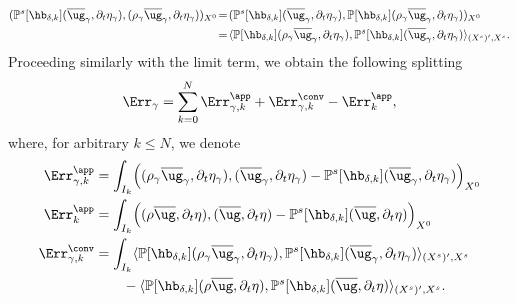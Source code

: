 \begin{align*}
( \mathbb{P}^{s}[\hb_{\delta, k}](\overline{\ug}_{\gamma},\partial_{t}\eta_{\gamma}),(\rho_{\gamma} \overline{\ug}_{\gamma},\partial_t \eta_{\gamma}))_{X^0}
& \!=\! ( \mathbb{P}^{s}[\hb_{\delta, k}](\overline{\ug}_{\gamma},\partial_{t}\eta_{\gamma}),\mathbb P[\hb_{\delta,k}](\rho_{\gamma} \overline{\ug}_{\gamma},\partial_t \eta_{\gamma}))_{X^0} \\
& \!=\! \langle \mathbb P[\hb_{\delta,k}](\rho_{\gamma} \overline{\ug}_{\gamma},\partial_t \eta_{\gamma}), \mathbb{P}^{s}[\hb_{\delta, k}](\overline{\ug}_{\gamma},\partial_{t}\eta_{\gamma}) \rangle_{(X^s)',X^s}.
\end{align*}
Proceeding similarly with the limit term, we obtain the following splitting
\[
\Err_{\gamma} = \sum_{k=0}^N \Err^{\app}_{\gamma,k} + \Err^{\conv}_{\gamma,k} - \Err^{\app}_{k},
\]
where, for arbitrary $k \leq N$, we denote
\begin{align*}
\Err^{\app}_{\gamma,k} & = \int_{I_{k}} \Bigl( (\rho_{\gamma} \overline{\ug}_{\gamma},\partial_t \eta_{\gamma}),( \overline{\ug}_{\gamma},\partial_t \eta_{\gamma})- \mathbb{P}^{s}[\hb_{\delta, k}](\overline{\ug}_{\gamma},\partial_{t}\eta_{\gamma})\Bigr)_{X^0} \\
\Err^{\app}_{k} &= \int_{I_{k}} \Bigl( (\rho \overline{\ug},\partial_t \eta),( \overline{\ug},\partial_t \eta)- \mathbb{P}^{s}[\hb_{\delta, k}](\overline{\ug},\partial_{t}\eta)\Bigr)_{X^0}\\
\Err^{\conv}_{\gamma,k} &= \int_{I_k} \langle \mathbb P[\hb_{\delta,k}](\rho_{\gamma} \overline{\ug}_{\gamma},\partial_t \eta_{\gamma}), \mathbb{P}^{s}[\hb_{\delta, k}](\overline{\ug}_{\gamma},\partial_{t}\eta_{\gamma}) \rangle_{(X^s)',X^s} \\
& \qquad
- \langle \mathbb P[\hb_{\delta,k}](\rho \overline{\ug},\partial_t \eta), \mathbb{P}^{s}[\hb_{\delta, k}](\overline{\ug},\partial_{t}\eta) \rangle_{(X^s)',X^s}.
\end{align*}

